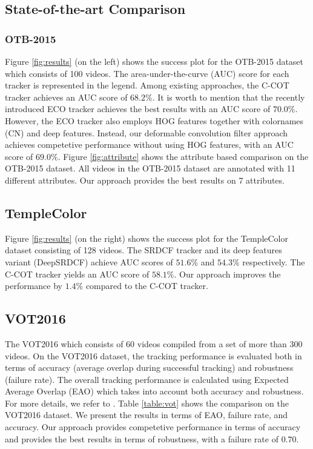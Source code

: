\documentclass[runningheads,a4paper]{llncs}
\begin{document}
\subsection{State-of-the-art Comparison}\subsubsection{OTB-2015}
Figure \ref{fig:results} (on the left) shows the success plot for the OTB-2015 dataset which consists of 100 videos. The area-under-the-curve (AUC) score for each tracker is represented in the legend. Among existing approaches, the C-COT tracker \cite{DanelljanECCV2016} achieves an AUC score of $68.2\%$. It is worth to mention that the recently introduced ECO tracker \cite{DanelljanCVPR2017} achieves the best results with an AUC score of $70.0\%$. However, the ECO tracker also employs HOG features together with colornames (CN) and deep features. Instead, our deformable convolution filter approach achieves competetive performance without using HOG features, with an AUC score of $69.0\%$. Figure \ref{fig:attribute} shows the attribute based comparison on the OTB-2015 dataset. All videos in the OTB-2015 dataset are annotated with 11 different attributes. Our approach provides the best results on 7 attributes.

\subsection{TempleColor}
Figure \ref{fig:results} (on the right) shows the success plot for the TempleColor dataset consisting of 128 videos. The SRDCF tracker \cite{DanelljanICCV2015} and its deep features variant (DeepSRDCF) \cite{DanelljanVOT2015} achieve AUC scores of $51.6\%$ and $54.3\%$ respectively. The C-COT tracker yields an AUC score of $58.1\%$. Our approach improves the performance by $1.4\%$ compared to the C-COT tracker.

\subsection{VOT2016}
The VOT2016 which consists of 60 videos compiled from a set of more than 300 videos. On the VOT2016 dataset, the tracking performance is evaluated both in terms of accuracy (average overlap during successful tracking) and robustness (failure rate). The overall tracking performance is calculated using Expected Average Overlap (EAO) which takes into account both accuracy and robustness. For more details, we refer to \cite{VOT2015}. Table \ref{table:vot} shows the comparison on the VOT2016 dataset. We present the results in terms of EAO, failure rate, and accuracy. Our approach provides competetive performance in terms of accuracy and provides the best results in terms of robustness, with a failure rate of $0.70$.
\end{document}
